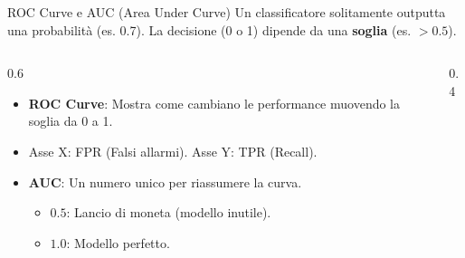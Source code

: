 \documentclass[aspectratio=169, 10pt]{beamer}
\begin{document}
\begin{frame}{ROC Curve e AUC (Area Under Curve)}
    Un classificatore solitamente outputta una probabilità (es. 0.7). La decisione (0 o 1) dipende da una \textbf{soglia} (es. $>0.5$).
    
    \begin{columns}
        \begin{column}{0.6\textwidth}
            \begin{itemize}
                \item \textbf{ROC Curve}: Mostra come cambiano le performance muovendo la soglia da 0 a 1.
                \item Asse X: FPR (Falsi allarmi). Asse Y: TPR (Recall).
                \item \textbf{AUC}: Un numero unico per riassumere la curva.
                \begin{itemize}
                    \item $0.5$: Lancio di moneta (modello inutile).
                    \item $1.0$: Modello perfetto.
                \end{itemize}
            \end{itemize}
        \end{column}
        \begin{column}{0.4\textwidth}
            \centering
        \end{column}
    \end{columns}
\end{frame}
\end{document}
